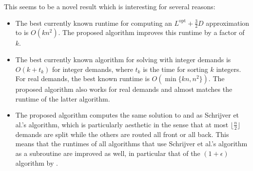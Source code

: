 This seems to be a novel result which is interesting for several reasons:
\begin{itemize}
	\item The best currently known runtime for computing an $L^\mathrm{opt} + \frac{3}{2}D$ approximation to \RL is $O(k n^2)$.
	The proposed algorithm improves this runtime by a factor of $k$.
	\item The best currently known algorithm for solving \RRL with integer demands is $O(k + t_k)$ for integer demands, where $t_k$ is the time for sorting $k$ integers.
	For real demands, the best known runtime is $O(\min\{kn, n^2\})$.
	The proposed algorithm also works for real demands and almost matches the runtime of the latter algorithm.
	\item The proposed algorithm computes the same solution to \RL and \RRL as Schrijver et al.'s algorithm, which is particularly aesthetic in the sense that at most $\lfloor\frac{n}{2}\rfloor$ demands are split while the others are routed all front or all back.
	This means that the runtimes of all algorithms that use Schrijver et al.'s algorithm as a subroutine are improved as well, in particular that of the $(1 + \epsilon)$ algorithm by \citet{khanna97}.
\end{itemize}
